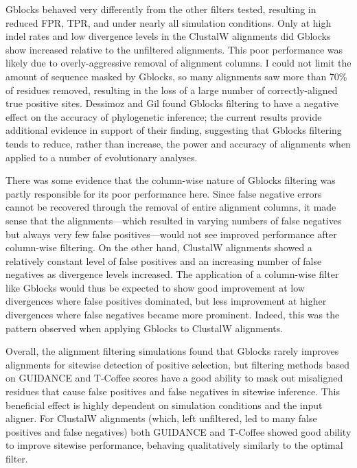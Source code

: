 Gblocks behaved very differently from the other filters tested,
resulting in reduced FPR, TPR, and \tpr under nearly all simulation
conditions. Only at high indel rates and low divergence levels in the
ClustalW alignments did Gblocks show increased \tpr relative to the
unfiltered alignments. This poor performance was likely due to
overly-aggressive removal of alignment columns. I could not limit the
amount of sequence masked by Gblocks, so many alignments saw more than
70\% of residues removed, resulting in the loss of a large number of
correctly-aligned true positive sites. Dessimoz and Gil
\citeyearpar{Dessimoz2010Phylogenetic} found Gblocks filtering to have
a negative effect on the accuracy of phylogenetic inference; the
current results provide additional evidence in support of their
finding, suggesting that Gblocks filtering tends to reduce, rather
than increase, the power and accuracy of alignments when applied to a
number of evolutionary analyses.

There was some evidence that the column-wise nature of Gblocks
filtering was partly responsible for its poor performance here. Since
false negative errors cannot be recovered through the removal of
entire alignment columns, it made sense that the \prankc
alignments---which resulted in varying numbers of false negatives but
always very few false positives---would not see improved performance
after column-wise filtering. On the other hand, ClustalW alignments
showed a relatively constant level of false positives and an
increasing number of false negatives as divergence levels
increased. The application of a column-wise filter like Gblocks would
thus be expected to show good improvement at low divergences where
false positives dominated, but less improvement at higher divergences
where false negatives became more prominent. Indeed, this was the
pattern observed when applying Gblocks to ClustalW alignments.

Overall, the alignment filtering simulations found that Gblocks rarely
improves alignments for sitewise detection of positive selection, but
filtering methods based on GUIDANCE and T-Coffee scores have a good
ability to mask out misaligned residues that cause false positives and
false negatives in sitewise inference. This beneficial effect is
highly dependent on simulation conditions and the input aligner. For
ClustalW alignments (which, left unfiltered, led to many false
positives and false negatives) both GUIDANCE and T-Coffee showed good
ability to improve sitewise performance, behaving qualitatively
similarly to the optimal filter.

